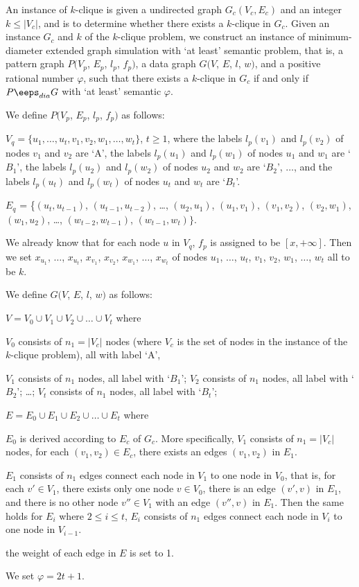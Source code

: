 An instance of $k$-clique is given a undirected graph $G_c(V_c,E_c)$ and an integer $k \leq |V_c|$, and is to determine whether there exists a $k$-clique in $G_c$. Given an instance $G_c$ and $k$ of the $k$-clique problem, we construct an instance of minimum-diameter extended graph simulation with `at least' semantic problem, that is, a pattern graph $P(V_p$, $E_p$, $l_p$, $f_p)$, a data graph $G(V$, $E$, $l$, $w)$, and a positive rational number $\varphi$, such that there exists a $k$-clique in $G_c$ if and only if $P \eeps_{dia} G$ with `at least' semantic \wrt $\varphi$.
\be
\item We define $P(V_p$, $E_p$, $l_p$, $f_p)$ as follows:
\bi
\item [(1)] $V_q = \{u_1, \ldots, u_t, v_1, v_2, w_1, \ldots, w_t\}$, $t \geq 1$, where the labels $l_p(v_1)$ and $l_p(v_2)$ of nodes $v_1$ and $v_2$ are `A', the labels $l_p(u_1)$ and $l_p(w_1)$ of nodes $u_1$ and $w_1$ are `$B_1$', the labels $l_p(u_2)$ and $l_p(w_2)$ of nodes $u_2$ and $w_2$ are `$B_2$', $\ldots$, and the labels $l_p(u_t)$ and $l_p(w_t)$ of nodes $u_t$ and $w_t$ are `$B_t$'.
\item [(2)] $E_q$ = \{$(u_t, u_{t-1})$, $(u_{t-1}, u_{t-2})$, \ldots, $(u_2, u_1)$, $(u_1, v_1)$, $(v_1, v_2)$, $(v_2, w_1)$, $(w_1, u_2)$, \ldots, $(w_{t-2}, w_{t-1})$, $(w_{t-1}, w_t)\}$.
\item [(3)] We already know that for each node $u$ in $V_q$, $f_p$ is assigned to be $[x, +\infty]$. Then we set $x_{u_1}$, $\ldots$, $x_{u_t}$, $x_{v_1}$, $x_{v_2}$, $x_{w_1}$, $\ldots$, $x_{w_t}$ of nodes $u_1$, $\ldots$, $u_t$, $v_1$, $v_2$, $w_1$, $\ldots$, $w_t$ all to be $k$.
\ei
\item We define $G(V$, $E$, $l$, $w)$ as follows:
\bi
\item [(1)] $V = V_0 \cup V_1 \cup V_2 \cup \ldots \cup V_t$ where
\bi
\item [(a)] $V_0$ consists of $n_1=|V_c|$ nodes (where $V_c$ is the set of nodes in the instance of the $k$-clique problem), all with label `A',
\item [(b)] $V_1$ consists of $n_1$ nodes, all label with `$B_1$'; $V_2$ consists of $n_1$ nodes, all label with `$B_2$'; \ldots; $V_t$ consists of $n_1$ nodes, all label with `$B_t$';
\ei
\item [(2)] $E = E_0 \cup E_1 \cup E_2 \cup \ldots \cup E_t$ where
\bi
\item [(a)] $E_0$ is derived according to $E_c$ of $G_c$. More specifically, $V_1$ consists of $n_1=|V_c|$ nodes, for each $(v_1, v_2)\in E_c$, there exists an edges $(v_1, v_2)$ in $E_1$.
\item [(b)] $E_1$ consists of $n_1$ edges connect each node in $V_1$ to one node in $V_0$, that is, for each $v' \in V_1$, there exists only one node $v \in V_0$, there is an edge $(v', v)$ in $E_1$, and there is no other node $v'' \in V_1$ with an edge $(v'', v)$ in $E_1$. Then the same holds for $E_i$ where $2 \leq i \leq t$, $E_i$ consists of $n_1$ edges connect each node in $V_i$ to one node in $V_{i-1}$.
\item [(c)] the weight of each edge in $E$ is set to 1.
\ei
\item [(3)] We set $\varphi=2t+1$.
\ei
\ee

